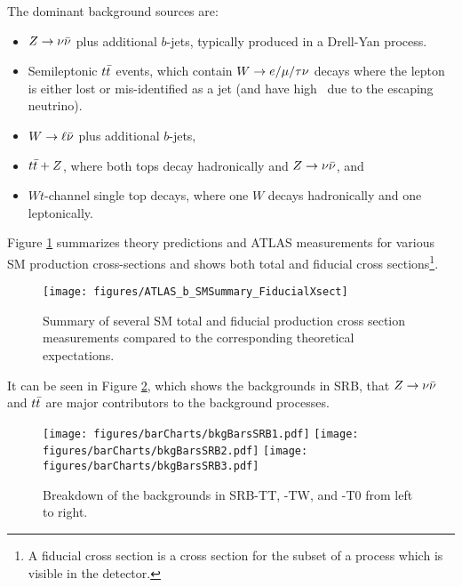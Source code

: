 The dominant background sources are:

\begin{itemize}
\item $Z\rightarrow \nu \bar{\nu}$ plus additional $b$-jets, typically produced in a Drell-Yan process.  
\item Semileptonic $t\bar{t}$ events, which contain $W \rightarrow e/\mu/\tau \nu$ decays where the lepton is either lost or mis-identified as a jet (and have high \met\ due to the escaping neutrino).
\item $W\rightarrow \ell \bar{\nu}$ plus additional $b$-jets, 
\item $t\bar{t}+Z$, where both tops decay hadronically and $Z\rightarrow \nu \bar{\nu}$, and
\item $Wt$-channel single top decays, where one $W$ decays hadronically and one leptonically.
\end{itemize}

Figure \ref{fig:atlasbsmsummaryfiducialxsect} summarizes theory predictions and ATLAS measurements for various SM production cross-sections and shows both total and fiducial cross sections\footnote{A fiducial cross section is a cross section for the subset of a process which is visible in the detector.}.  \\




\begin{figure}[tbh!]
	\centering
	\texttt{[image: figures/ATLAS\_b\_SMSummary\_FiducialXsect]}
	\caption[SM fiducial production cross sections.]{Summary of several SM total and fiducial production cross section measurements compared to the corresponding theoretical expectations\cite{atlassmsummaryplots}.}
	\label{fig:atlasbsmsummaryfiducialxsect}
\end{figure}

It can be seen in Figure \ref{fig:bkgSRB}, which shows the backgrounds in SRB, that $Z\rightarrow \nu \bar{\nu}$ and $t\bar{t}$ are major contributors to the background processes. \\


\begin{figure}[H] 
\begin{center}
 \texttt{[image: figures/barCharts/bkgBarsSRB1.pdf]} %
 \texttt{[image: figures/barCharts/bkgBarsSRB2.pdf]} %
 \texttt{[image: figures/barCharts/bkgBarsSRB3.pdf]} %
    \caption[Backgrounds in SRB.]{Breakdown of the backgrounds in SRB-TT, -TW, and -T0 from left to right.}
    \label{fig:bkgSRB}
\end{center}
\end{figure}


